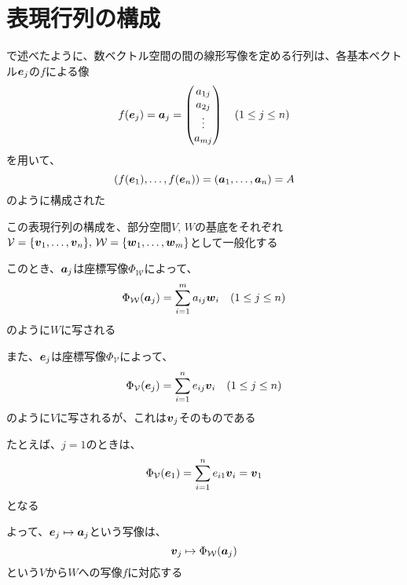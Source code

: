 \documentclass[../../../topic_linear-algebra]{subfiles}
\begin{document}
\sectionline
\section{表現行列の構成}\label{sec:construction-of-matrix-rep}

で述べたように、数ベクトル空間の間の線形写像を定める行列は、各基本ベクトル$\vb*{e}_j$の$f$による像
\begin{equation*}
  f(\vb*{e}_j) = \vb*{a}_j = \begin{pmatrix}
    a_{1j} \\
    a_{2j} \\
    \vdots \\
    a_{mj}
  \end{pmatrix} \quad (1 \leq j \leq n)
\end{equation*}
を用いて、
\begin{equation*}
  \left( f(\vb*{e}_1), \ldots, f(\vb*{e}_n) \right) = \left( \vb*{a}_1, \ldots, \vb*{a}_n \right) = A
\end{equation*}
のように構成された

\br

この表現行列の構成を、部分空間$V,\,W$の基底をそれぞれ$\mathcal{V} = \{ \vb*{v}_1,\ldots, \vb*{v}_n\}, \, \mathcal{W} = \{\vb*{w}_1, \ldots, \vb*{w}_m\}$として一般化する

\br

このとき、$\vb*{a}_j$は座標写像$\Phi_{\mathcal{W}}$によって、
\begin{equation*}
  \Phi_{\mathcal{W}}(\vb*{a}_j) = \sum_{i=1}^m a_{ij} \vb*{w}_i \quad (1 \leq j \leq n)
\end{equation*}
のように$W$に写される

\br

また、$\vb*{e}_j$は座標写像$\Phi_{\mathcal{V}}$によって、
\begin{equation*}
  \Phi_{\mathcal{V}}(\vb*{e}_j) = \sum_{i=1}^n e_{ij} \vb*{v}_i \quad (1 \leq j \leq n)
\end{equation*}
のように$V$に写されるが、これは$\vb*{v}_j$そのものである

たとえば、$j=1$のときは、
\begin{equation*}
  \Phi_{\mathcal{V}}(\vb*{e}_1) = \sum_{i=1}^n e_{i1} \vb*{v}_i = \vb*{v}_1
\end{equation*}
となる

\br

よって、$\vb*{e}_j \mapsto \vb*{a}_j$という写像は、
\begin{equation*}
  \vb*{v}_j \mapsto \Phi_{\mathcal{W}}(\vb*{a}_j)
\end{equation*}
という$V$から$W$への写像$f$に対応する
\end{document}
